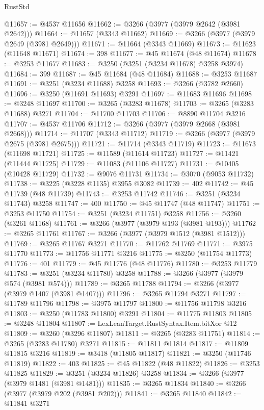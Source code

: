 \begin{lexlean}{RustStd}
\begin{coremodule}
@11657 := @4537 @11656
@11662 := @3266 (@3977 (@3979 @2642 (@3981 @2642)))
@11664 := @11657 (@3343 @11662)
@11669 := @3266 (@3977 (@3979 @2649 (@3981 @2649)))
@11671 := @11664 (@3343 @11669)
@11673 := @11623 (@11648 @11671)
@11674 := 398
@11677 := @45 @11674 (@48 @11674)
@11678 := @3253 @11677
@11683 := @3250 (@3251 (@3234 @11678) @3258 @3974)
@11684 := 399
@11687 := @45 @11684 (@48 @11684)
@11688 := @3253 @11687
@11691 := @3251 (@3234 @11688) @3258
@11693 := @3266 (@3782 @2660)
@11696 := @3250 (@11691 @11693) @3291
@11697 := @11683 @11696
@11698 := @3248 @11697
@11700 := @3265 (@3283 @11678)
@11703 := @3265 (@3283 @11688) @3271
@11704 := @11700 @11703
@11706 := @8890 @11704 @3216
@11707 := @4537 @11706
@11712 := @3266 (@3977 (@3979 @2668 (@3981 @2668)))
@11714 := @11707 (@3343 @11712)
@11719 := @3266 (@3977 (@3979 @2675 (@3981 @2675)))
@11721 := @11714 (@3343 @11719)
@11723 := @11673 (@11698 @11721)
@11725 := @11589 (@11614 @11723)
@11727 := @11421 (@11444 @11725)
@11729 := @11083 (@11106 @11727)
@11731 := @10405 (@10428 @11729)
@11732 := @9076 @11731
@11734 := @3070 (@9053 @11732)
@11738 := @3225 (@3228 @1135) @3955 @3082
@11739 := 402
@11742 := @45 @11739 (@48 @11739)
@11743 := @3253 @11742
@11746 := @3251 (@3234 @11743) @3258
@11747 := 400
@11750 := @45 @11747 (@48 @11747)
@11751 := @3253 @11750
@11754 := @3251 (@3234 @11751) @3258
@11756 := @3260 (@3261 @1168)
@11761 := @3266 (@3977 (@3979 @193 (@3981 @193)))
@11762 := @3265 @11761
@11767 := @3266 (@3977 (@3979 @1512 (@3981 @1512)))
@11769 := @3265 @11767 @3271
@11770 := @11762 @11769
@11771 := @3975 @11770
@11773 := @11756 @11771 @3216
@11775 := @3250 (@11754 @11773)
@11776 := 401
@11779 := @45 @11776 (@48 @11776)
@11780 := @3253 @11779
@11783 := @3251 (@3234 @11780) @3258
@11788 := @3266 (@3977 (@3979 @574 (@3981 @574)))
@11789 := @3265 @11788
@11794 := @3266 (@3977 (@3979 @1407 (@3981 @1407)))
@11796 := @3265 @11794 @3271
@11797 := @11789 @11796
@11798 := @3975 @11797
@11800 := @11756 @11798 @3216
@11803 := @3250 (@11783 @11800) @3291
@11804 := @11775 @11803
@11805 := @3248 @11804
@11807 := LexLeanTarget.RustSyntax.Item.bitXor @12
@11809 := @3260 (@3296 @11807)
@11811 := @3265 (@3283 @11751)
@11814 := @3265 (@3283 @11780) @3271
@11815 := @11811 @11814
@11817 := @11809 @11815 @3216
@11819 := @3418 (@11805 @11817)
@11821 := @3250 (@11746 @11819)
@11822 := 403
@11825 := @45 @11822 (@48 @11822)
@11826 := @3253 @11825
@11829 := @3251 (@3234 @11826) @3258
@11834 := @3266 (@3977 (@3979 @1481 (@3981 @1481)))
@11835 := @3265 @11834
@11840 := @3266 (@3977 (@3979 @202 (@3981 @202)))
@11841 := @3265 @11840
@11842 := @11841 @3271

\end{coremodule}
\end{lexlean}
